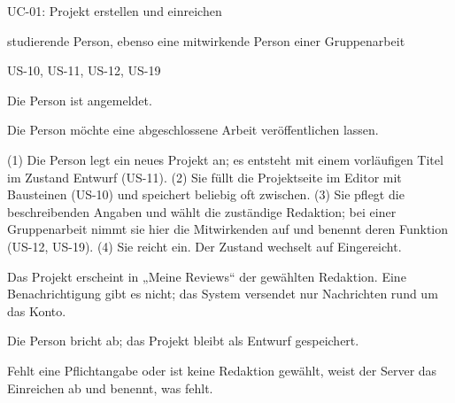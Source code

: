 \begin{usecase}{UC-01: Projekt erstellen und einreichen}
	\item[Akteur:] studierende Person, ebenso eine mitwirkende Person einer Gruppenarbeit
	\item[Bezug:] US-10, US-11, US-12, US-19
	\item[Vorbedingung:] Die Person ist angemeldet.
	\item[Auslöser:] Die Person möchte eine abgeschlossene Arbeit veröffentlichen lassen.
	\item[Ablauf:] (1) Die Person legt ein neues Projekt an; es entsteht mit einem vorläufigen Titel im Zustand Entwurf (US-11). (2) Sie füllt die Projektseite im Editor mit Bausteinen (US-10) und speichert beliebig oft zwischen. (3) Sie pflegt die beschreibenden Angaben und wählt die zuständige Redaktion; bei einer Gruppenarbeit nimmt sie hier die Mitwirkenden auf und benennt deren Funktion (US-12, US-19). (4) Sie reicht ein. Der Zustand wechselt auf Eingereicht.
	\item[Nachbedingung:] Das Projekt erscheint in „Meine Reviews“ der gewählten Redaktion. Eine Benachrichtigung gibt es nicht; das System versendet nur Nachrichten rund um das Konto.
	\item[Alternativablauf:] Die Person bricht ab; das Projekt bleibt als Entwurf gespeichert.
	\item[Fehlerfall:] Fehlt eine Pflichtangabe oder ist keine Redaktion gewählt, weist der Server das Einreichen ab und benennt, was fehlt.
\end{usecase}

